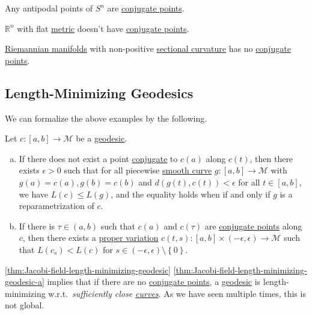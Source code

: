 \begin{eg}
	Any antipodal points of \(S^n\) are \hyperref[def:conjugate-point]{conjugate points}.
\end{eg}

\begin{eg}
	\(\mathbb{R} ^n\) with flat \hyperref[def:Riemannian-metric]{metric} doesn't have \hyperref[def:conjugate-point]{conjugate points}.
\end{eg}

\begin{eg}
	\hyperref[def:Riemannian-manifold]{Riemannian manifolds} with non-positive \hyperref[def:sectional-curvature]{sectional curvature} has no \hyperref[def:conjugate-point]{conjugate points}.
\end{eg}

\subsection{Length-Minimizing Geodesics}
We can formalize the above examples by the following.

\begin{theorem}\label{thm:Jacobi-field-length-minimizing-geodesic}
	Let \(c\colon [a, b] \to \mathcal{M} \) be a \hyperref[def:geodesic]{geodesic}.
	\begin{enumerate}[(a)]
		\item\label{thm:Jacobi-field-length-minimizing-geodesic-a} If there does not exist a point \hyperref[def:conjugate-point]{conjugate} to \(c(a)\) along \(c(t)\), then there exists \(\epsilon > 0\) such that for all piecewise \hyperref[def:curve]{smooth curve} \(g\colon [a, b] \to \mathcal{M} \) with \(g(a) = c(a), g(b) = c(b)\) and \(d(g(t), c(t)) < \epsilon \) for all \(t\in [a, b]\), we have \(L(c) \leq L(g)\), and the equality holds when if and only if \(g\) is a reparametrization of \(c\).
		\item\label{thm:Jacobi-field-length-minimizing-geodesic-b} If there is \(\tau \in (a, b)\) such that \(c(a)\) and \(c(\tau )\) are \hyperref[def:conjugate-point]{conjugate points} along \(c\), then there exists a \hyperref[not:proper-variation]{proper variation} \(c(t, s) \colon [a, b] \times (-\epsilon , \epsilon ) \to \mathcal{M} \) such that \(L(c_s) < L(c)\) for \(s \in (-\epsilon , \epsilon ) \setminus \left\{ 0 \right\} \).
	\end{enumerate}
\end{theorem}

\autoref{thm:Jacobi-field-length-minimizing-geodesic} \autoref{thm:Jacobi-field-length-minimizing-geodesic-a} implies that if there are no \hyperref[def:conjugate-point]{conjugate points}, a \hyperref[def:geodesic]{geodesic} is length-minimizing w.r.t.\ \emph{sufficiently close \hyperref[def:curve]{curves}}. As we have seen multiple times, this is not global.

